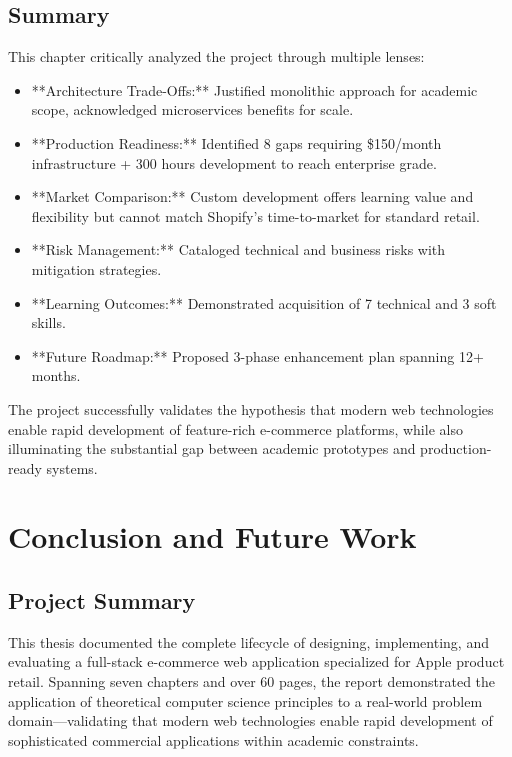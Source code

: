 \section{Summary}

This chapter critically analyzed the project through multiple lenses:

\begin{itemize}
    \item **Architecture Trade-Offs:** Justified monolithic approach for academic scope, acknowledged microservices benefits for scale.
    \item **Production Readiness:** Identified 8 gaps requiring \$150/month infrastructure + 300 hours development to reach enterprise grade.
    \item **Market Comparison:** Custom development offers learning value and flexibility but cannot match Shopify's time-to-market for standard retail.
    \item **Risk Management:** Cataloged technical and business risks with mitigation strategies.
    \item **Learning Outcomes:** Demonstrated acquisition of 7 technical and 3 soft skills.
    \item **Future Roadmap:** Proposed 3-phase enhancement plan spanning 12+ months.
\end{itemize}

The project successfully validates the hypothesis that modern web technologies enable rapid development of feature-rich e-commerce platforms, while also illuminating the substantial gap between academic prototypes and production-ready systems.


\chapter{Conclusion and Future Work}

\section{Project Summary}

This thesis documented the complete lifecycle of designing, implementing, and evaluating a full-stack e-commerce web application specialized for Apple product retail. Spanning seven chapters and over 60 pages, the report demonstrated the application of theoretical computer science principles to a real-world problem domain—validating that modern web technologies enable rapid development of sophisticated commercial applications within academic constraints.


